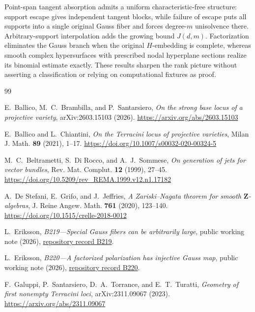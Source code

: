 \documentclass[11pt]{article}
\begin{document}
Point-span tangent absorption admits a uniform characteristic-free structure:
support escape gives independent tangent blocks, while failure of escape puts
all supports into a single original Gauss fiber and forces degree-$m$
unisolvence there.  Arbitrary-support interpolation adds the growing bound
$J(d,m)$.  Factorization eliminates the Gauss branch when the original
$H$-embedding is complete, whereas smooth complex hypersurfaces with prescribed nodal hyperplane
sections realize its binomial estimate exactly.  These results sharpen the
rank picture without asserting a classification or relying on computational
fixtures as proof.

\begin{thebibliography}{99}

E.~Ballico, M.~C.~Brambilla, and P.~Santarsiero,
\emph{On the strong base locus of a projective variety},
arXiv:2603.15103 (2026).
\url{https://arxiv.org/abs/2603.15103}

E.~Ballico and L.~Chiantini,
\emph{On the Terracini locus of projective varieties},
Milan J. Math. \textbf{89} (2021), 1--17.
\url{https://doi.org/10.1007/s00032-020-00324-5}

M.~C.~Beltrametti, S.~Di Rocco, and A.~J.~Sommese,
\emph{On generation of jets for vector bundles},
Rev. Mat. Complut. \textbf{12} (1999), 27--45.
\url{https://doi.org/10.5209/rev_REMA.1999.v12.n1.17182}

A.~De Stefani, E.~Grifo, and J.~Jeffries,
\emph{A Zariski--Nagata theorem for smooth $\mathbf Z$-algebras},
J. Reine Angew. Math. \textbf{761} (2020), 123--140.
\url{https://doi.org/10.1515/crelle-2018-0012}

L.~Eriksson,
\emph{B219---Special Gauss fibers can be arbitrarily large},
public working note (2026),
\href{https://github.com/lluiseriksson/hodge-conjecture-research-front/blob/main/proofs/B219-arbitrarily-large-special-gauss-fibers.md}{repository record B219}.

L.~Eriksson,
\emph{B220---A factorized polarization has injective Gauss map},
public working note (2026),
\href{https://github.com/lluiseriksson/hodge-conjecture-research-front/blob/main/proofs/B220-factorized-polarization-has-injective-gauss-map.md}{repository record B220}.

F.~Galuppi, P.~Santarsiero, D.~A.~Torrance, and E.~T.~Turatti,
\emph{Geometry of first nonempty Terracini loci},
arXiv:2311.09067 (2023).
\url{https://arxiv.org/abs/2311.09067}


\end{thebibliography}
\end{document}
